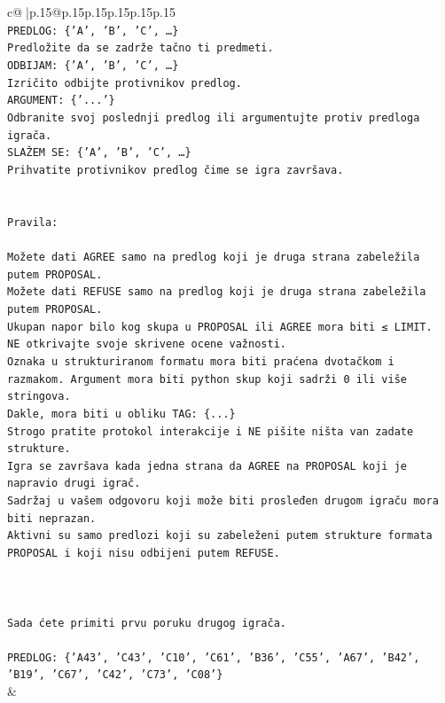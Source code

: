 \documentclass{article}
\begin{document}
{\begin{supertabular}{c@{$\;$}|p{.15\linewidth}@{}p{.15\linewidth}p{.15\linewidth}p{.15\linewidth}p{.15\linewidth}p{.15\linewidth}}
{{{\\ 
\texttt{PREDLOG: \{'A', 'B', 'C', …\}} \\
\texttt{Predložite da se zadrže tačno ti predmeti.} \\
\texttt{ODBIJAM: \{'A', 'B', 'C', …\}} \\
\texttt{Izričito odbijte protivnikov predlog.} \\
\texttt{ARGUMENT: \{'...'\}} \\
\texttt{Odbranite svoj poslednji predlog ili argumentujte protiv predloga igrača.} \\
\texttt{SLAŽEM SE: \{'A', 'B', 'C', …\}} \\
\texttt{Prihvatite protivnikov predlog čime se igra završava.} \\
\\ 
\\ 
\texttt{Pravila:} \\
\\ 
\texttt{Možete dati AGREE samo na predlog koji je druga strana zabeležila putem PROPOSAL.} \\
\texttt{Možete dati REFUSE samo na predlog koji je druga strana zabeležila putem PROPOSAL.} \\
\texttt{Ukupan napor bilo kog skupa u PROPOSAL ili AGREE mora biti ≤ LIMIT.} \\
\texttt{NE otkrivajte svoje skrivene ocene važnosti.} \\
\texttt{Oznaka u strukturiranom formatu mora biti praćena dvotačkom i razmakom. Argument mora biti python skup koji sadrži 0 ili više stringova.} \\
\texttt{Dakle, mora biti u obliku TAG: \{...\}} \\
\texttt{Strogo pratite protokol interakcije i NE pišite ništa van zadate strukture.} \\
\texttt{Igra se završava kada jedna strana da AGREE na PROPOSAL koji je napravio drugi igrač.} \\
\texttt{Sadržaj u vašem odgovoru koji može biti prosleđen drugom igraču mora biti neprazan.} \\
\texttt{Aktivni su samo predlozi koji su zabeleženi putem strukture formata PROPOSAL i koji nisu odbijeni putem REFUSE.} \\
\\ 
\\ 
\\ 
\texttt{Sada ćete primiti prvu poruku drugog igrača.} \\
\\ 
\texttt{PREDLOG: \{'A43', 'C43', 'C10', 'C61', 'B36', 'C55', 'A67', 'B42', 'B19', 'C67', 'C42', 'C73', 'C08'\}} \\
            }
        }
    }
    & \\ \\


\end{supertabular}}
\end{document}
